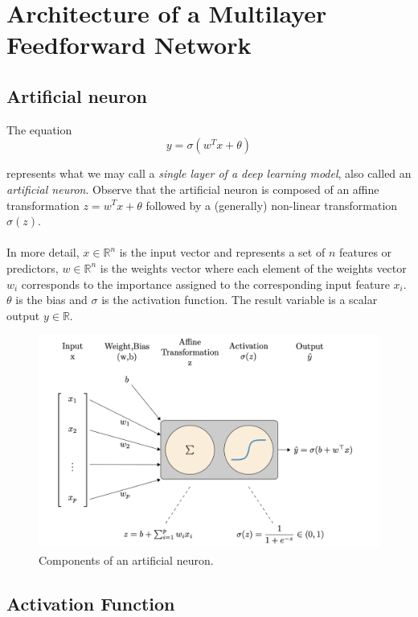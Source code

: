 \documentclass[../main.tex]{subfiles}
\begin{document}
	 
	 \section{Architecture of a Multilayer Feedforward Network}
	 \subsection{Artificial neuron}
	 \noindent The equation
	  \begin{equation}
	  	y=\sigma(w^Tx + \theta) \tag{2}
	  	\label{eq:sig}
	  \end{equation}
  
   \noindent represents what we may call a \textit{single layer of a deep learning model}, also called an \textit{artificial neuron}.  Observe that the artificial neuron is composed of an affine transformation $ z=w^Tx + \theta$ followed by a (generally) non-linear transformation $\sigma(z)$. \\ \\ In more detail, $x \in \mathbb{R}^n$ is the input vector and represents a set of $n$ features or predictors, $w\in  \mathbb{R}^n$ is the weights vector where each element of the weights vector $w_i$ corresponds to the importance assigned to the corresponding input feature $x_i$. $\theta$ is the bias and $\sigma$ is the activation function. The result variable is a scalar output $y \in \mathbb{R}$. 
 
   
   \begin{figure}[h]
   	\centering
   	\includegraphics[width=0.7\linewidth]{imgs/neu}
   	\caption{\small Components of an artificial neuron. \cite{mateng}} 
   \end{figure} \mbox{} \par
 \subsection{Activation Function}
 
\end{document}
